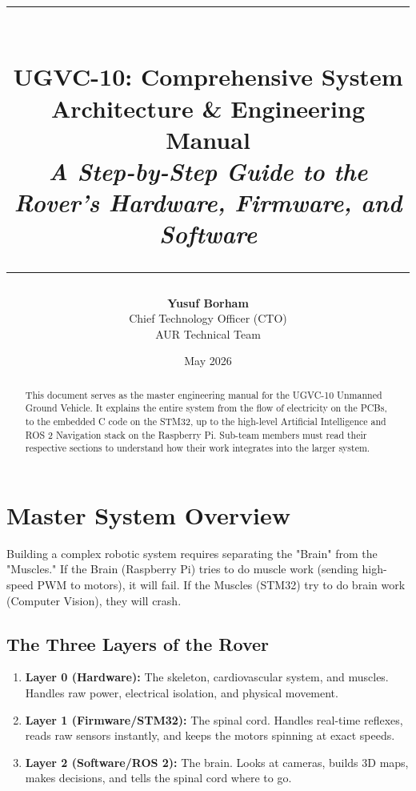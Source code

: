 \documentclass[12pt, a4paper]{article}
\title{
    \vspace{-2cm}
    \rule{\textwidth}{1pt}\\[0.5cm]
    \Huge \textbf{UGVC-10: Comprehensive System Architecture \& Engineering Manual}\\
    \Large \textit{A Step-by-Step Guide to the Rover's Hardware, Firmware, and Software}\\
    \rule{\textwidth}{1pt}
}
\author{\textbf{Yusuf Borham} \\ Chief Technology Officer (CTO) \\ AUR Technical Team}
\date{May 2026}
\begin{document}
\maketitle
\thispagestyle{empty}

\begin{abstract}
\noindent This document serves as the master engineering manual for the UGVC-10 Unmanned Ground Vehicle. It explains the entire system from the flow of electricity on the PCBs, to the embedded C code on the STM32, up to the high-level Artificial Intelligence and ROS 2 Navigation stack on the Raspberry Pi. Sub-team members must read their respective sections to understand how their work integrates into the larger system.
\end{abstract}

\newpage
\tableofcontents
\newpage

\section{Master System Overview}
Building a complex robotic system requires separating the "Brain" from the "Muscles." If the Brain (Raspberry Pi) tries to do muscle work (sending high-speed PWM to motors), it will fail. If the Muscles (STM32) try to do brain work (Computer Vision), they will crash.

\subsection{The Three Layers of the Rover}
\begin{enumerate}
    \item \textbf{Layer 0 (Hardware):} The skeleton, cardiovascular system, and muscles. Handles raw power, electrical isolation, and physical movement.
    \item \textbf{Layer 1 (Firmware/STM32):} The spinal cord. Handles real-time reflexes, reads raw sensors instantly, and keeps the motors spinning at exact speeds.
    \item \textbf{Layer 2 (Software/ROS 2):} The brain. Looks at cameras, builds 3D maps, makes decisions, and tells the spinal cord where to go.
\end{enumerate}
\end{document}
